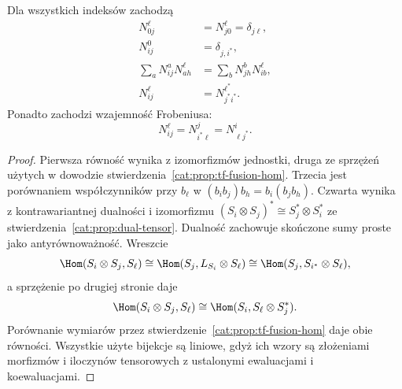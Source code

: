 \begin{stwierdzenie}\label{cat:prop:tf-fusion-identities}
Dla wszystkich indeksów zachodzą
\[
\begin{aligned}
 N_{0j}^{\ell}&=N_{j0}^{\ell}=\delta_{j\ell},\\
 N_{ij}^{0}&=\delta_{j,i^*},\\
 \sum_a N_{ij}^a N_{ah}^{\ell}
 &=\sum_b N_{jh}^b N_{ib}^{\ell},\\
 N_{ij}^{\ell}&=N_{j^*i^*}^{\ell^*}.
\end{aligned}
\]
Ponadto zachodzi wzajemność Frobeniusa:
\[
 N_{ij}^{\ell}=N_{i^*\ell}^{j}=N_{\ell j^*}^{i}.
\]
\end{stwierdzenie}
\begin{proof}
Pierwsza równość wynika z izomorfizmów jednostki, druga ze sprzężeń użytych w dowodzie stwierdzenia~\ref{cat:prop:tf-fusion-hom}. Trzecia jest porównaniem współczynników przy $b_\ell$ w $(b_ib_j)b_h=b_i(b_jb_h)$. Czwarta wynika z kontrawariantnej dualności i izomorfizmu $(S_i\otimes S_j)^*\cong S_j^*\otimes S_i^*$ ze stwierdzenia~\ref{cat:prop:dual-tensor}. Dualność zachowuje skończone sumy proste jako antyrównoważność. Wreszcie
\[
 \Hom(S_i\otimes S_j,S_\ell)
 \cong\Hom(S_j,L_{S_i}\otimes S_\ell)
 \cong\Hom(S_j,S_{i^*}\otimes S_\ell),
\]
a sprzężenie po drugiej stronie daje
\[
 \Hom(S_i\otimes S_j,S_\ell)
 \cong\Hom(S_i,S_\ell\otimes S_j^*).
\]
Porównanie wymiarów przez stwierdzenie~\ref{cat:prop:tf-fusion-hom} daje obie równości. Wszystkie użyte bijekcje są liniowe, gdyż ich wzory są złożeniami morfizmów i iloczynów tensorowych z ustalonymi ewaluacjami i koewaluacjami.
\end{proof}

